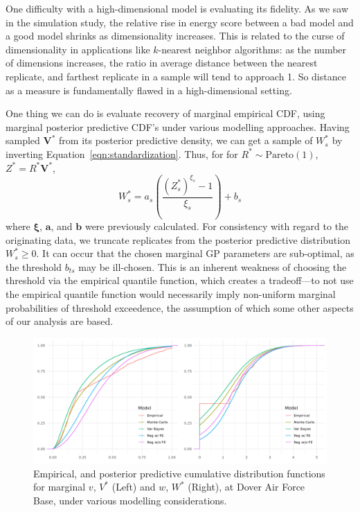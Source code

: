One difficulty with a high-dimensional model is evaluating its fidelity.  As we saw in the simulation
    study, the relative rise in energy score between a bad model and a good model shrinks as
    dimensionality increases.  This is related to the curse of dimensionality in applications like
    $k$-nearest neighbor algorithms: as the number of dimensions increases, the ratio in average
    distance between the nearest replicate, and farthest replicate in a sample will tend to approach 1.
    So distance as a measure is fundamentally flawed in a high-dimensional setting.

One thing we can do is evaluate recovery of marginal empirical CDF, using marginal
    posterior predictive CDF's under various modelling approaches.
    Having sampled $\bm{V}^{*}$ from its posterior predictive density, we can get a sample of $W_s^*$
    by inverting Equation~\eqref{eqn:standardization}.  Thus, for for $R^*\sim\text{Pareto}(1)$, 
    $Z^* = R^*\bm{V}^*$,
    \begin{equation*}
        W_s^* = a_s\left(\frac{(Z_s^*)^{\xi_s} - 1}{\xi_s}\right) + b_s
    \end{equation*}
    where $\bm{\xi}$, $\bm{a}$, and $\bm{b}$ were previously calculated.  
    For consistency with regard to the originating data, we truncate replicates 
    from the posterior predictive distribution $W_{s}^* \geq 0$.  
    It can occur that the chosen marginal GP parameters are sub-optimal, as the threshold
    $b_{ts}$ may be ill-chosen.  This is an inherent weakness of choosing
    the threshold via the empirical quantile function, which creates a 
    tradeoff---to not use the empirical quantile function would necessarily imply 
    non-uniform marginal probabilities of threshold exceedence, the assumption of 
    which some other aspects of our analysis are based.

\begin{figure}[ht]
    \caption{Empirical, and posterior predictive cumulative distribution functions for marginal 
    $v$, $V^*$ (Left) and $w$, $W^*$ (Right), at Dover Air Force Base, under various modelling
    considerations.\label{plot:marginal_doverafb}}
    \centering
    \includegraphics[width=\textwidth]{./plots/delaware_marginal_dover_afb.png}
\end{figure}


